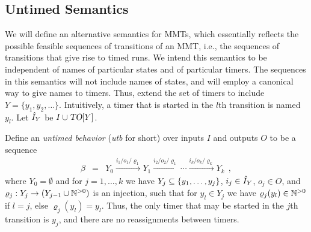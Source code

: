 \subsection{Untimed Semantics}
We will define an alternative semantics for MMTs, which essentially reflects the
possible feasible sequences of transitions of an MMT, i.e., the sequences of
transitions that give rise to timed runs.
We intend this semantics to be independent of names of particular states and
of particular timers. The sequences in this semantics will not include
names of states, and will employ a canonical way to give names to timers. Thus,
extend the set of timers to include $Y = \{ y_1, y_2,\ldots \}$. Intuitively,
a timer that is started in the $l$th transition is named $y_l$.
Let $\hat{I}_{Y}$ be $I \cup \mbox{\sl TO}[Y]$.

Define an \emph{untimed behavior} (\emph{utb} for short)
over inputs $I$ and outputs $O$ to be a sequence 
\begin{eqnarray*}
  \beta & = & Y_0 \xrightarrow{i_1/o_1/\varrho_1} Y_1  \xrightarrow{i_2/o_2/\varrho_1} \cdots \xrightarrow{i_k/o_k/\varrho_k} Y_{k}
  \ \ ,
\end{eqnarray*}
where $Y_0 = \emptyset$ and for $j = 1, \ldots , k$ we have
$Y_j \subseteq \lbrace y_1, \ldots , y_j\rbrace$, $i_j \in \hat{I}_{Y}$, $o_j \in O$,
and $\varrho_j: Y_j \rightarrow (Y_{j-1} \cup {\mathbb N}^{>0})$ is an injection, such
that for $y_l \in Y_j$ we have $\varrho_j(y_l) \in {\mathbb N}^{>0}$ if $l=j$, else $\varrho_j(y_l) = y_l$.
Thus, the only timer that may be started in the $j$th transition is $y_j$, and there are no reassignments between timers.

